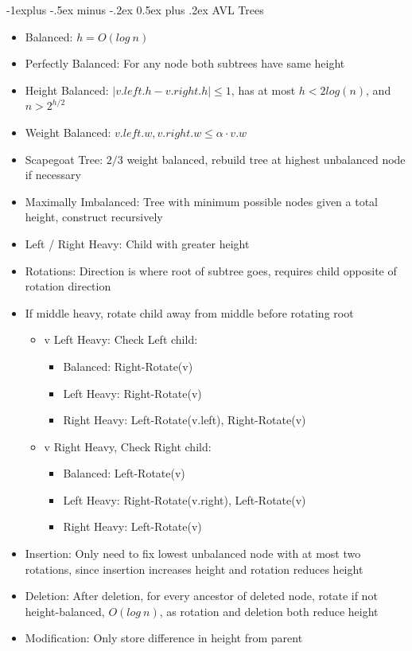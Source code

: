 \documentclass[10pt, landscape]{article}
\makeatletter
\renewcommand{\section}{\@startsection{section}{1}{0mm}%
                                {-1ex plus -.5ex minus -.2ex}%
                                {0.5ex plus .2ex}%
                                {\normalfont\large\bfseries}}
\renewcommand{\section}{\@startsection{section}{2}{0mm}%
                                {-1explus -.5ex minus -.2ex}%
                                {0.5ex plus .2ex}%
                                {\normalfont\normalsize\bfseries}}
\makeatother
\begin{document}
\begin{multicols*}{4}
\section{AVL Trees}
\begin{itemize}
    \item Balanced: $h=O(log \ n)$
    \item Perfectly Balanced: For any node both subtrees have same height
    \item Height Balanced: $|v.left.h-v.right.h|\leq 1$, has at most $h<2log(n)$, and $n>2^{h/2}$
    \item Weight Balanced: $v.left.w, v.right.w \leq \alpha \cdot v.w$
    \item Scapegoat Tree: $2/3$ weight balanced, rebuild tree at highest unbalanced node if necessary
    \item Maximally Imbalanced: Tree with minimum possible nodes given a total height, construct recursively
    \item Left / Right Heavy: Child with greater height
    \item Rotations: Direction is where root of subtree goes, requires child opposite of rotation direction
    \item If middle heavy, rotate child away from middle before rotating root
    \begin{itemize}
        \item v Left
        Heavy: Check Left child:
        \begin{itemize}
            \item Balanced: Right-Rotate(v)
            \item Left Heavy: Right-Rotate(v)
            \item Right Heavy: Left-Rotate(v.left), Right-Rotate(v)
        \end{itemize}
        \item v Right
        Heavy, Check Right child:
        \begin{itemize}
            \item Balanced: Left-Rotate(v)
            \item Left Heavy: Right-Rotate(v.right), Left-Rotate(v)
            \item Right Heavy: Left-Rotate(v)
        \end{itemize}
    \end{itemize}
    \item Insertion: Only need to fix lowest unbalanced node with at most two rotations, since insertion increases height and rotation reduces height
    \item Deletion: After deletion, for every ancestor of deleted node, rotate if not height-balanced, $O(log \ n)$, as rotation and deletion both reduce height
    \item Modification: Only store difference in height from parent
\end{itemize}


\end{multicols*}
\end{document}
